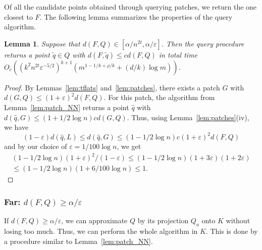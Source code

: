 \documentclass[a4paper,11pt]{paper}
\newcommand{\eps}{\varepsilon}
\newtheorem{lemma}[theorem]{Lemma}
\begin{document}
\noindent
Of all the candidate points obtained through querying
patches, we return the one closest to $F$.
The following lemma summarizes the properties of the
query algorithm.
\begin{lemma}\label{lem:nearQuery}
  Suppose that $d(F, Q) \in [\alpha/n^{2t}, \alpha/\eps]$.
  Then the query procedure returns
  a point $\widetilde{q} \in Q$ with
  $d(F, \widetilde{q}) \leq cd(F, Q)$ in
  total time
  $O_c((k^2n^{2t}\eps^{-5/2})^{k+1}(m^{1-1/k+\rho/k} + (d/k)\log m))$.
\end{lemma}
\begin{proof}
  By Lemmas~\ref{lem:tflats} and~\ref{lem:patches},
  there exists a patch $G$ with $d(G, Q) \leq (1 + \eps)^2d(F, Q)$.
  For this patch, the algorithm from Lemma~\ref{lem:patch_NN}
  returns a point $\widehat{q}$ with
  $d(\widehat{q}, G) \leq (1+1/2\log n)cd(G, Q)$.
  Thus, using Lemma~\ref{lem:patches}(iv), we have
  \[
      (1-\eps)d(\widehat{q}, L) \leq d(\widehat{q}, G)
      \leq (1-1/2\log n)c(1 + \eps)^2d(F, Q)
  \]
  and
  by our choice of $\eps = 1/100\log n$, we get
    \begin{multline*}
    (1-1/2\log n)(1 + \eps)^2/(1-\eps)
      \leq
      (1-1/2\log n)(1 + 3\eps)(1+2\eps)\\
      \leq (1-1/2\log n)(1 + 6/100\log n)
      \leq 1.
    \end{multline*}
\end{proof}

\subsubsection{Far: $d(F, Q) \geq \alpha/\eps$}\label{sec:far}

If $d(F, Q) \geq \alpha/\eps$, we can approximate $Q$ by its
projection $Q_a$ onto $K$ without losing too much.
Thus, we can perform the whole algorithm in $K$.
This is done by a procedure similar to Lemma~\ref{lem:patch_NN}.
\end{document}

